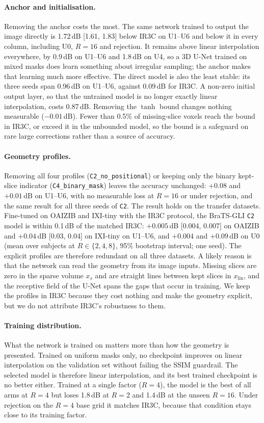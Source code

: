 \documentclass[a4paper,fleqn]{cas-dc}
\begin{document}
\paragraph{Anchor and initialisation.} Removing the anchor costs the most. The same network
trained to output the image directly is 1.72\,dB [1.61, 1.83] below IR3C on U1--U6 and below
it in every column, including U0, $R=16$ and rejection. It remains above linear
interpolation everywhere, by 0.9\,dB on U1--U6 and 1.8\,dB on U4, so a 3D U-Net trained on
mixed masks does learn something about irregular sampling; the anchor makes that learning
much more effective. The direct model is also the least stable: its three seeds span
0.96\,dB on U1--U6, against 0.09\,dB for IR3C. A non-zero initial output layer, so that the
untrained model is no longer exactly linear interpolation, costs 0.87\,dB. Removing the
$\tanh$ bound changes nothing measurable ($-0.01$\,dB). Fewer than 0.5\% of missing-slice
voxels reach the bound in IR3C, or exceed it in the unbounded model, so the bound is a
safeguard on rare large corrections rather than a source of accuracy.

\paragraph{Geometry profiles.} Removing all four profiles (\texttt{C2\_no\_positional}) or
keeping only the binary kept-slice indicator (\texttt{C4\_binary\_mask}) leaves the accuracy
unchanged: $+0.08$ and $+0.01$\,dB on U1--U6, with no measurable loss at $R=16$ or under
rejection, and
the same result for all three seeds of \texttt{C2}. The result holds on the transfer
datasets. Fine-tuned on OAIZIB and IXI-tiny with the IR3C protocol, the BraTS-GLI
\texttt{C2} model is within 0.1\,dB of the matched IR3C: $+0.005$\,dB [0.004, 0.007] on
OAIZIB and $+0.04$\,dB [0.03, 0.04] on IXI-tiny on U1--U6, and $+0.004$ and $+0.09$\,dB on
U0 (mean over subjects at $R\in\{2,4,8\}$, 95\% bootstrap interval; one seed). The explicit
profiles are therefore redundant on all three datasets. A likely reason is that the network can read the geometry from its
image inputs. Missing slices are zero in the sparse volume $x_s$ and are straight lines
between kept slices in $x_{\mathrm{lin}}$, and the receptive field of the U-Net spans the
gaps that occur in training. We keep the profiles in IR3C because they cost nothing and make
the geometry explicit, but we do not attribute IR3C's robustness to them.

\paragraph{Training distribution.} What the network is trained on matters more than how the
geometry is presented. Trained on uniform masks only, no checkpoint improves on linear
interpolation on the validation set without failing the SSIM guardrail. The selected
model is therefore linear interpolation, and its best trained checkpoint is no better
either. Trained at a single factor ($R=4$), the model is the best of all arms at $R=4$ but
loses 1.8\,dB at $R=2$ and 1.4\,dB at the unseen $R=16$. Under rejection on the $R=4$ base
grid it matches IR3C, because that condition stays close to its training factor.
\end{document}
